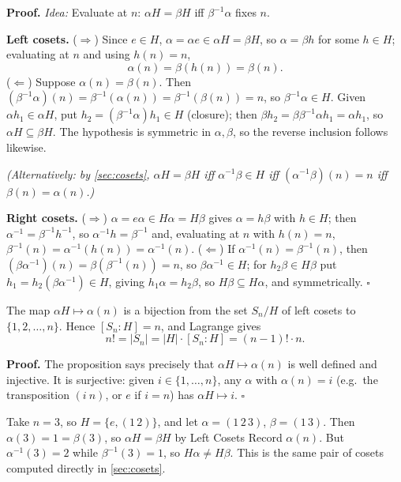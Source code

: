 \documentclass[11pt]{report}
\renewenvironment{proof}[1][Proof]{\noindent\textbf{#1.} }{\hfill$\square$\par\vspace{5pt}}
\begin{document}
\begin{proof}
\textit{Idea:} Evaluate at $n$: $\alpha H = \beta H$ iff $\beta^{-1}\alpha$ fixes $n$.\par
\textbf{Left cosets.} ($\Rightarrow$) Since $e \in H$, $\alpha = \alpha e \in \alpha H = \beta H$, so $\alpha = \beta h$ for some $h \in H$; evaluating at $n$ and using $h(n) = n$,
\[ \alpha(n) = \beta(h(n)) = \beta(n). \]
($\Leftarrow$) Suppose $\alpha(n) = \beta(n)$. Then $(\beta^{-1}\alpha)(n) = \beta^{-1}(\alpha(n)) = \beta^{-1}(\beta(n)) = n$, so $\beta^{-1}\alpha \in H$. Given $\alpha h_1 \in \alpha H$, put $h_2 = (\beta^{-1}\alpha)h_1 \in H$ (closure); then $\beta h_2 = \beta\beta^{-1}\alpha h_1 = \alpha h_1$, so $\alpha H \subseteq \beta H$. The hypothesis is symmetric in $\alpha, \beta$, so the reverse inclusion follows likewise.

\emph{(Alternatively: by \ref{sec:cosets}, $\alpha H = \beta H$ iff $\alpha^{-1}\beta \in H$ iff $(\alpha^{-1}\beta)(n) = n$ iff $\beta(n) = \alpha(n)$.)}

\textbf{Right cosets.} ($\Rightarrow$) $\alpha = e\alpha \in H\alpha = H\beta$ gives $\alpha = h\beta$ with $h \in H$; then $\alpha^{-1} = \beta^{-1}h^{-1}$, so $\alpha^{-1}h = \beta^{-1}$ and, evaluating at $n$ with $h(n) = n$, $\beta^{-1}(n) = \alpha^{-1}(h(n)) = \alpha^{-1}(n)$. ($\Leftarrow$) If $\alpha^{-1}(n) = \beta^{-1}(n)$, then $(\beta\alpha^{-1})(n) = \beta(\beta^{-1}(n)) = n$, so $\beta\alpha^{-1} \in H$; for $h_2\beta \in H\beta$ put $h_1 = h_2(\beta\alpha^{-1}) \in H$, giving $h_1\alpha = h_2\beta$, so $H\beta \subseteq H\alpha$, and symmetrically.
\end{proof}

\begin{corbox}\label{cor:index-stabilizer}
The map $\alpha H \mapsto \alpha(n)$ is a bijection from the set $S_n/H$ of left cosets to $\{1, 2, \ldots, n\}$. Hence $[S_n : H] = n$, and Lagrange gives
\[ n! = |S_n| = |H| \cdot [S_n : H] = (n-1)!\cdot n. \]
\end{corbox}

\begin{proof}
The proposition says precisely that $\alpha H \mapsto \alpha(n)$ is well defined and injective. It is surjective: given $i \in \{1, \ldots, n\}$, any $\alpha$ with $\alpha(n) = i$ (e.g.\ the transposition $(i\ n)$, or $e$ if $i = n$) has $\alpha H \mapsto i$.
\end{proof}

\begin{exbox}\label{ex:left-right-cosets-h-s3}
Take $n = 3$, so $H = \{e, (1\,2)\}$, and let $\alpha = (1\,2\,3)$, $\beta = (1\,3)$. Then $\alpha(3) = 1 = \beta(3)$, so $\alpha H = \beta H$ by Left Cosets Record $\alpha(n)$. But $\alpha^{-1}(3) = 2$ while $\beta^{-1}(3) = 1$, so $H\alpha \neq H\beta$. This is the same pair of cosets computed directly in \ref{sec:cosets}.
\end{exbox}
\end{document}
